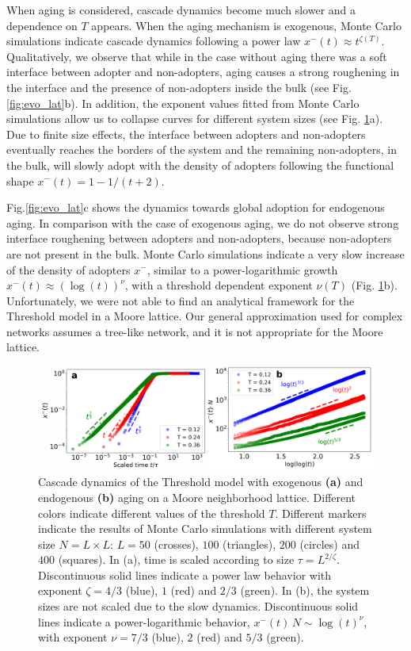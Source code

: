 When aging is considered, cascade dynamics become much slower and a dependence on $T$ appears. When the aging mechanism is exogenous, Monte Carlo simulations indicate cascade dynamics following a power law $x^{-}(t) \approx t^{\zeta(T)}$. Qualitatively, we observe that while in the case without aging there was a soft interface between adopter and non-adopters, aging causes a strong roughening in the interface and the presence of non-adopters inside the bulk (see Fig. \ref{fig:evo_lat}b). In addition, the exponent values fitted from Monte Carlo simulations allow us to collapse curves for different system sizes (see Fig. \ref{fig:lattice}a). Due to finite size effects, the interface between adopters and non-adopters eventually reaches the borders of the system and the remaining non-adopters, in the bulk, will slowly adopt with the density of adopters following the functional shape $x^{-}(t) = 1- 1/(t+2)$.

Fig.\ref{fig:evo_lat}c shows the dynamics towards global adoption for endogenous aging. In comparison with the case of exogenous aging, we do not observe strong interface roughening between adopters and non-adopters, because non-adopters are not present in the bulk. Monte Carlo simulations indicate a very slow increase of the density of adopters $x^{-}$, similar to a power-logarithmic growth  $x^{-}(t) \approx (\log(t))^{\nu}$, with a threshold dependent exponent $\nu(T)$  (Fig. \ref{fig:lattice}b). Unfortunately, we were not able to find an analytical framework for the Threshold model in a Moore lattice. Our general approximation used for complex networks assumes a tree-like network, and it is not appropriate for the Moore lattice. 

\begin{figure}
    \centering \captionsetup{font=sf}
    \includegraphics[width=\columnwidth]{Figs/Aging_Threshold/FIGA.pdf}
    \caption[Cascade dynamics snapshots in a lattice]{\label{fig:lattice} Cascade dynamics of the Threshold model with exogenous \textbf{(a)} and endogenous \textbf{(b)} aging on a Moore neighborhood lattice. Different colors indicate different values of the threshold $T$. Different markers indicate the results of Monte Carlo simulations with different system size $N = L \times L$:  $L = 50$ (crosses), $100$ (triangles), $200$ (circles) and $400$ (squares). In (a), time is scaled according to size $\tau = L^{2 / \zeta}$. Discontinuous solid lines indicate a power law behavior with exponent $ \zeta = 4/3$ (blue), $1$ (red) and $2/3$ (green). In (b), the system sizes are not scaled due to the slow dynamics. Discontinuous solid lines indicate a power-logarithmic behavior, $x^{-}(t) \, N \sim \log(t)^{\nu} $, with exponent $ \nu = 7/3$ (blue), $2$ (red) and $5/3$ (green).}
\end{figure}
    


